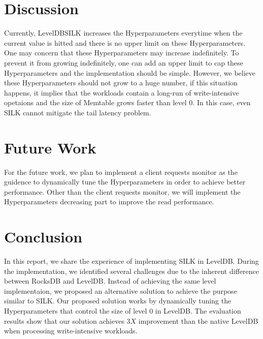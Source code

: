 \documentclass[letter,twocolumn,10pt]{article}
\begin{document}
\section{Discussion}
\label{sec:discussion}
Currently, LevelDBSILK increases the Hyperparameters everytime when the current value is hitted and there is no upper limit on these Hyperparameters. One may concern that these Hyperparameters may increase indefinitely. To prevent it from growing indefinitely, one can add an upper limit to cap these Hyperparameters and the implementation should be simple. However, we believe these Hyperparameters should not grow to a huge number, if this situation happens, it implies that the workloads contain a long-run of write-intensive opetaions and the size of Memtable grows faster than level 0. In this case, even SILK cannot mitigate the tail latency problem.    

\section{Future Work}
\label{sec:futurework}
For the future work, we plan to implement a client requests monitor as the guidence to dynamically tune the Hyperparameters in order to achieve better performance. Other than the client requests monitor, we will implement the Hyperparameters decreasing part to improve the read performance. 

\section{Conclusion}
\label{sec:conclusion}
In this report, we share the experience of implementing SILK in LevelDB. During the implementation, we identified several challenges due to the inherent difference between RocksDB and LevelDB. Instead of achieving the same level implementaion, we proposed an alternative solution to achieve the purpose similar to SILK. Our proposed solution works by dynamically tuning the Hyperparameters that control the size of level $0$ in LevelDB. The evaluation results show that our solution achieves $3X$ improvement than the native LevelDB when processing write-intensive workloads.  

{\footnotesize 


}
\end{document}
